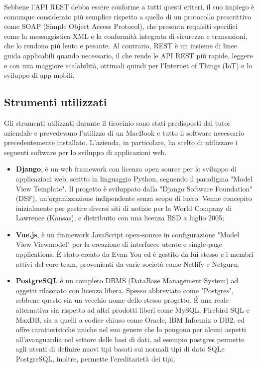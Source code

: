 \documentclass[12pt,a4paper]{article}
\begin{document}
Sebbene l'API REST debba essere conforme a tutti questi criteri, il suo impiego è comunque considerato più semplice rispetto a quello di un protocollo prescrittivo come SOAP (Simple Object Access Protocol), che presenta requisiti specifici come la messaggistica XML e la conformità integrata di sicurezza e transazioni, che lo rendono più lento e pesante.
Al contrario, REST è un insieme di linee guida applicabili quando necessario, il che rende le API REST più rapide, leggere e con una maggiore scalabilità, ottimali quindi per l'Internet of Things (IoT) e lo sviluppo di app mobili.

\subsection{Strumenti utilizzati}
Gli strumenti utilizzati durante il tirocinio sono stati predisposti dal tutor aziendale e prevedevano l’utilizzo di un MacBook e tutto il software necessario precedentemente installato.
L'azienda, in particolare, ha scelto di utilizzare i seguenti software per lo sviluppo di applicazioni web.

\begin{itemize}
    \item \textbf{Django}, è un web framework con licenza open source per lo sviluppo di applicazioni web, scritto in linguaggio Python, seguendo il paradigma "Model View Template". Il progetto è sviluppato dalla "Django Software Foundation" (DSF), un'organizzazione indipendente senza scopo di lucro. Venne concepito inizialmente per gestire diversi siti di notizie per la World Company di Lawrence (Kansas), e distribuito con una licenza BSD a luglio 2005;

    \item \textbf{Vue.js}, è un framework JavaScript open-source in configurazione "Model View Viewmodel" per la creazione di interfacce utente e single-page applications. È stato creato da Evan You ed è gestito da lui stesso e i membri attivi del core team, provenienti da varie società come Netlify e Netguru;

    \item\textbf{PostgreSQL} è un completo DBMS (DataBase Management System) ad oggetti rilasciato con licenza libera. Spesso abbreviato come "Postgres", sebbene questo sia un vecchio nome dello stesso progetto. É una reale alternativa sia rispetto ad altri prodotti liberi come MySQL, Firebird SQL e MaxDB, sia a quelli a codice chiuso come Oracle, IBM Informix o DB2, ed offre caratteristiche uniche nel suo genere che lo pongono per alcuni aspetti all'avanguardia nel settore delle basi di dati, ad esempio postgres permette agli utenti di definire nuovi tipi basati sui normali tipi di dato SQLe PostgreSQL, inoltre, permette l'ereditarietà dei tipi;
\end{itemize}
\end{document}
